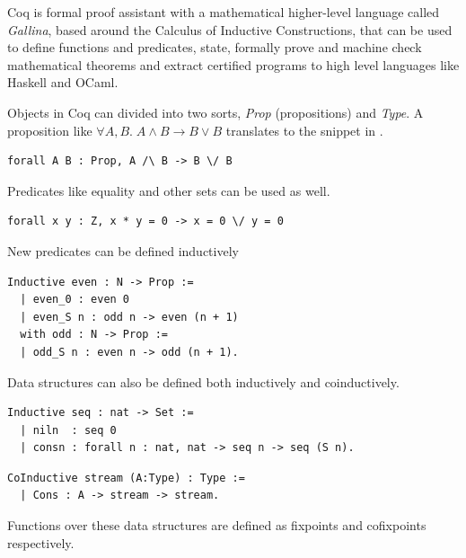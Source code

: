 \documentclass[12pt,twoside,notitlepage]{report}
\begin{document}
Coq is formal proof assistant with a mathematical higher-level language called \textit{Gallina}, based around the Calculus of Inductive Constructions, that can be used to define functions and predicates, state, formally prove and machine check mathematical theorems and extract certified programs to high level languages like Haskell and OCaml.

Objects in Coq can divided into two sorts, \textit{Prop} (propositions) and \textit{Type}. A proposition like $ \forall A, B.\; A \wedge B \rightarrow B \vee B $ translates to the snippet in .

\begin{lstlisting}[language={Coq},caption={Coq Prop logic example},label={lst:coqproplogex}]
forall A B : Prop, A /\ B -> B \/ B
\end{lstlisting}

Predicates like equality and other sets can be used as well.

\begin{lstlisting}[language={Coq},caption={Coq Prop predicate example}]
forall x y : Z, x * y = 0 -> x = 0 \/ y = 0
\end{lstlisting}

New predicates can be defined inductively

\begin{lstlisting}[language={Coq},caption={Coq Prop new predicate example}]
 Inductive even : N -> Prop :=
  | even_0 : even 0
  | even_S n : odd n -> even (n + 1)
  with odd : N -> Prop :=
  | odd_S n : even n -> odd (n + 1).
\end{lstlisting}

Data structures can also be defined both inductively and coinductively.

\begin{lstlisting}[language={Coq},caption={Coq inductive data structure example}]
 Inductive seq : nat -> Set :=
  | niln  : seq 0
  | consn : forall n : nat, nat -> seq n -> seq (S n).
\end{lstlisting}

\begin{lstlisting}[language={Coq},caption={Coq coinductive data structure example}]
 CoInductive stream (A:Type) : Type :=
  | Cons : A -> stream -> stream.
\end{lstlisting}

Functions over these data structures are defined as fixpoints and cofixpoints respectively.
\end{document}
